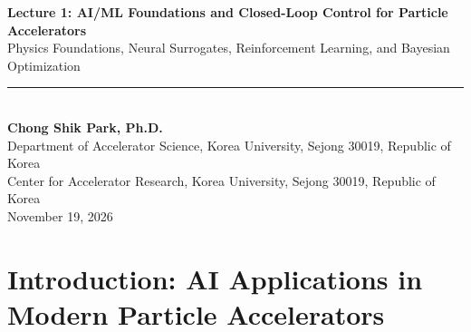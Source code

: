\documentclass[11pt,a4paper]{article}
\newcommand{\affiliation}[1]{{\normalsize\color{darkgray} #1} \\[0.2em]}
\begin{document}
\begin{center}
    {\LARGE\bfseries\color{primaryblue} Lecture 1: AI/ML Foundations and Closed-Loop Control for Particle Accelerators} \\[0.8em]
    {\large\color{darkgray} Physics Foundations, Neural Surrogates, Reinforcement Learning, and Bayesian Optimization} \\[0.5em]
    \rule{\textwidth}{1.2pt} \\[0.5em]
    \textbf{Chong Shik Park, Ph.D.} \\[0.3em]
    \affiliation{Department of Accelerator Science, Korea University, Sejong 30019, Republic of Korea}
    \affiliation{Center for Accelerator Research, Korea University, Sejong 30019, Republic of Korea}
    \vspace{0.2em}
    {\small\color{darkgray} November 19, 2026}
\end{center}

\vspace{0.5em}

\begin{abstract}
Modern particle accelerator facilities operate with thousands of tightly coupled magnet actuators and diagnostics under sub-micron beam stability tolerances. Classical linear feedback systems face fundamental bottlenecks in non-linear regimes where magnetic core saturation and power supply limits degrade control fidelity. This lecture provides the theoretical and computational foundation bridging transverse beam dynamics, Hill's equation, and the Orbit Response Matrix (ORM) with cutting-edge supervised machine learning, reinforcement learning, and Bayesian optimization. We explore the design and training of neural surrogate digital twins to model cubic saturation, compare classical singular value decomposition (SVD) with model-based bounded optimization (\texttt{L-BFGS-B}), investigate physics-informed closed-loop reinforcement learning policy agents with adaptive harmonic damping, and examine sample-efficient Bayesian optimization using Gaussian processes and Lower Confidence Bound (LCB) acquisition for the afternoon Beam Orbit Alignment Mini-Hackathon.
\end{abstract}

\clearpage

\tableofcontents

\clearpage

\section{Introduction: AI Applications in Modern Particle Accelerators}
\end{document}
